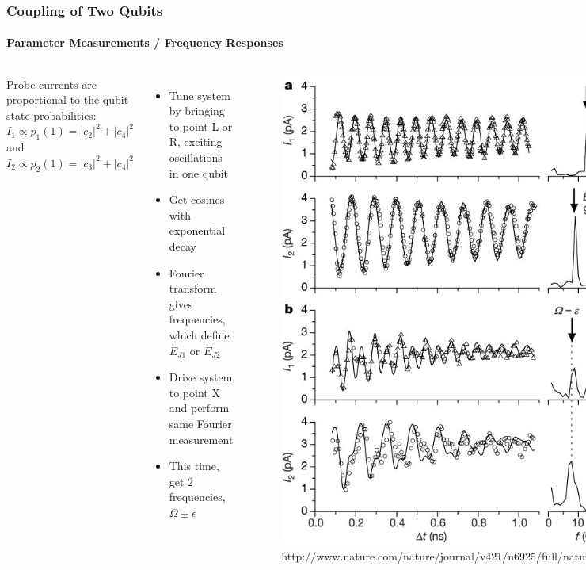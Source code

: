 \documentclass{beamer}
\begin{document}

\begin{frame}
    \frametitle{Coupling of Two Qubits}
    \framesubtitle{Parameter Measurements / Frequency Responses}
    \begin{columns}
            \fontsize{6}{9}\selectfont
            Probe currents are proportional to the qubit state probabilities: $I_1 \propto p_1(1) = |c_2|^2 + |c_4|^2$ and $I_2 \propto p_2(1) = |c_3|^2 + |c_4|^2$
            \begin{itemize}
                \item Tune system by bringing to point L or R, exciting oscillations in one qubit
                \item Get cosines with exponential decay
                \item Fourier transform gives frequencies, which define $E_{J1}$ or $E_{J2}$
                \item Drive system to point X and perform same Fourier measurement
                \item This time, get 2 frequencies, $\Omega \pm \epsilon$
            \end{itemize}
            \begin{figure}[ht!]
                \centering
                \includegraphics[height=0.6\textheight]{img/probe-current-osc.jpg}
                \caption{http://www.nature.com/nature/journal/v421/n6925/full/nature01365.html}
            \end{figure}
    \end{columns}
\end{frame}
\end{document}
